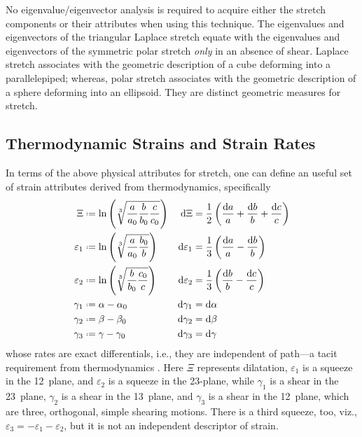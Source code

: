 No eigen\-value\slash eigen\-vector analysis is required to acquire either the stretch components or their attributes when using this technique. \cite{Srinivasa12} The eigen\-values and eigen\-vectors of the triangular Laplace stretch equate with the eigen\-values and eigen\-vectors of the symmetric polar stretch \textit{only\/} in an absence of shear. \cite{Rosakis90}  Laplace stretch associates with the geometric description of a cube deforming into a parallelepiped; whereas, polar stretch associates with the geometric description of a sphere deforming into an ellipsoid.  They are distinct geometric measures for stretch.

\subsection{Thermodynamic Strains and Strain Rates}
\label{strainsAndStrainRates3D}

In terms of the above physical attributes for stretch, one can define an useful set of strain attributes derived from thermo\-dynamics, specifically \cite{Freed17}
\begin{subequations}
    \label{thermodynamicStrains3D}
    \begin{align}
    \Xi & \defeq \ln \left( \sqrt[3]{\frac{a}{a_0} \frac{b}{b_0} \frac{c}{c_0}} \right) & 
    \mathrm{d} \Xi & = \frac{1}{2} \left( \frac{\mathrm{d}a}{a} + 
    \frac{\mathrm{d}b}{b} + \frac{\mathrm{d}c}{c} \right) \\
    \varepsilon_1 & \defeq \ln \left( \sqrt[3]{\frac{a}{a_0} \frac{b_0}{b}} \right) &
    \mathrm{d} \varepsilon_1 & = \frac{1}{3} \left( \frac{\mathrm{d}a}{a} - 
    \frac{\mathrm{d}b}{b} \right) \\
    \varepsilon_2 & \defeq \ln \left( \sqrt[3]{\frac{b}{b_0} \frac{c_0}{c}} \right) &
    \mathrm{d} \varepsilon_2 & = \frac{1}{3} \left( \frac{\mathrm{d}b}{b} - 
    \frac{\mathrm{d}c}{c} \right) \\
    \gamma_1 & \defeq \alpha - \alpha_0 & 
    \mathrm{d} \gamma_1 & = \mathrm{d} \alpha \\
    \gamma_2 & \defeq \beta - \beta_0 & 
    \mathrm{d} \gamma_2 & = \mathrm{d} \beta \\
    \gamma_3 & \defeq \gamma - \gamma_0 & 
    \mathrm{d} \gamma_3 & = \mathrm{d} \gamma
    \end{align}
\end{subequations}
whose rates are exact differentials, i.e., they are independent of path---a tacit requirement from thermo\-dynamics \cite{Caratheodory09}.  Here $\Xi$ represents dilatation, $\varepsilon_1$ is a squeeze in the 12~plane, and $\varepsilon_2$ is a squeeze in the 23-plane, while $\gamma_1$ is a shear in the 23~plane, $\gamma_2$ is a shear in the 13~plane, and $\gamma_3$ is a shear in the 12~plane, which are three, orthogonal, simple shearing motions.  There is a third squeeze, too, viz., $\varepsilon_3 = -\varepsilon_1 - \varepsilon_2$, but it is not an independent descriptor of strain.

